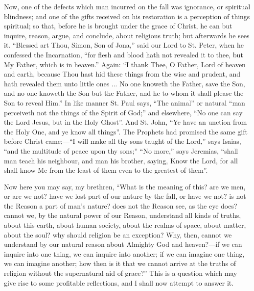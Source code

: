 Now, one of the defects which man incurred on the fall was
ignorance, or spiritual blindness; and one of the gifts received on
his restoration is a perception of things spiritual; so that, before
he is brought under the grace of Christ, he can but inquire, reason,
argue, and conclude, about religious truth; but afterwards he sees it.
``Blessed art Thou, Simon, Son of Jona,'' said our Lord to St.
Peter, when he confessed the Incarnation, ``for flesh and blood
hath not revealed it to thee, but My Father, which is in heaven.''
Again: ``I thank Thee, O Father, Lord of heaven and earth, because
Thou hast hid these things from the wise and prudent, and hath
revealed them unto little ones ... No one knoweth the Father, save the
Son, and no one knoweth the Son but the Father, and he to whom it
shall please the Son to reveal Him.'' In like manner St. Paul
says, ``The animal'' or natural ``man perceiveth not the
things of the Spirit of God;'' and elsewhere, ``No one can say
the Lord Jesus, but in the Holy Ghost''. And St. John, ``Ye
have an unction from the Holy One, and ye know all things''. The
Prophets had promised the same gift before Christ came;—``I will
make all thy sons taught of the Lord,'' says Isaias, ``and the
multitude of peace upon thy sons;'' ``No more,'' says
Jeremias, ``shall man teach his neighbour, and man his brother,
saying, Know the Lord, for all shall know Me from the least of them
even to the greatest of them''.

Now here you may say, my brethren, ``What is the meaning of
this? are we men, or are we not? have we lost part of our nature by
the fall, or have we not? is not the Reason a part of man's nature?
does not the Reason see, as the eye does? cannot we, by the natural
power of our Reason, understand all kinds of truths, about this earth,
about human society, about the realms of space, about matter, about
the soul? why should religion be an exception? Why, then, cannot we
understand by our natural reason about Almighty God and heaven?—if
we can inquire into one thing, we can inquire into another; if we can
imagine one thing, we can imagine another; how then is it that we
cannot arrive at the truths of religion without the supernatural aid
of grace?'' This is a question which may give rise to some
profitable reflections, and I shall now attempt to answer it.

